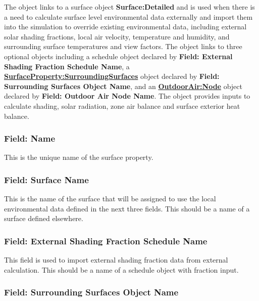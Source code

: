 The object links to a surface object \textbf{Surface:Detailed} and is used when there is a need to calculate surface level environmental data externally and import them into the simulation to override existing environmental data, including external solar shading fractions, local air velocity, temperature and humidity, and surrounding surface temperatures and view factors. The object links to three optional objects including a schedule object declared by \textbf{Field: External Shading Fraction Schedule Name}, a \textbf{\hyperref[surfacePropertysurroundingSurfaces]{SurfaceProperty:SurroundingSurfaces}} object declared by \textbf{Field: Surrounding Surfaces Object Name}, and an \textbf{\hyperref[outdoorairnode]{OutdoorAir:Node}} object declared by \textbf{Field: Outdoor Air Node Name}. The object provides inputs to calculate shading, solar radiation, zone air balance and surface exterior heat balance.

\subsubsection{Field: Name}\label{field-surf-localenv-name}

This is the unique name of the surface property.

\subsubsection{Field: Surface Name}\label{surfacePropertylocalEnvironment-field-surface-name}

This is the name of the surface that will be assigned to use the local environmental data defined in the next three fields.  This should be a name of a surface defined elsewhere.

\subsubsection{Field: External Shading Fraction Schedule Name}\label{field-external-shading-fraction-schedule-name}

This field is used to import external shading fraction data from external calculation. This should be a name of a schedule object with fraction input.

\subsubsection{Field: Surrounding Surfaces Object Name}\label{field-surrounding-surfaces-object-name}


